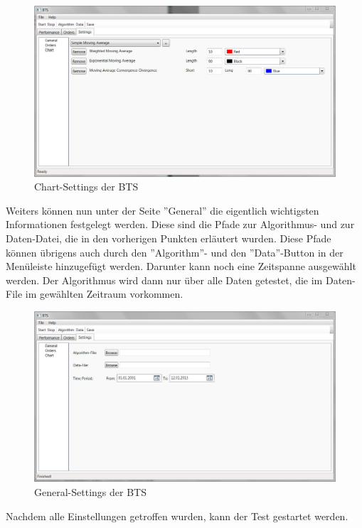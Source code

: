 \begin{figure}[H]
\centering
\includegraphics[width=1\textwidth]{images/btschartsettings.png}
\caption{Chart-Settings der \gls{BTS}}
\end{figure}

Weiters können nun unter der Seite ''General'' die eigentlich wichtigsten Informationen festgelegt werden. Diese sind die Pfade zur Algorithmus- und zur Daten-Datei, die in den vorherigen Punkten erläutert wurden. Diese Pfade können übrigens auch durch den ''Algorithm''- und den ''Data''-Button in der Menüleiste hinzugefügt werden. Darunter kann noch eine Zeitspanne ausgewählt werden. Der Algorithmus wird dann nur über alle Daten getestet, die im Daten-File im gewählten Zeitraum vorkommen.

\begin{figure}[H]
\centering
\includegraphics[width=1\textwidth]{images/btsgeneralsettings.png}
\caption{General-Settings der \gls{BTS}}
\end{figure}

Nachdem alle Einstellungen getroffen wurden, kann der Test gestartet werden.


